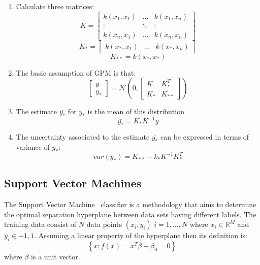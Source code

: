 \begin{enumerate}
\item Calculate three matrices:
\begin{equation}
K=\begin{bmatrix}
k(x_1,x_1) &  \ldots & k(x_1,x_n)\\ 
\vdots  & \ddots &\vdots  \\ 
k(x_n,x_1) &  \ldots & k(x_n,x_n)
\end{bmatrix}
\end{equation}
\begin{equation}
K_*= \begin{bmatrix}
k(x_*,x_1) & \ldots & k(x_*,x_n)
\end{bmatrix}
\end{equation}
\begin{equation}
K_{**}=k(x_*,x_*)
\end{equation}
\item The basic assumption of GPM is that:
\begin{equation}
\begin{bmatrix}
y\\
y_* 
\end{bmatrix}
=\mathcal{N}(0,\begin{bmatrix}
K & K_{*}^{T}\\ 
K_* & K_{**}
\end{bmatrix})
\end{equation}
\item The estimate $\bar{y_*} $ for $y_*$ is the mean of this distribution
\begin{equation}
\bar{y_*}=K_* K^{-1}y
\end{equation}
\item The uncertainty associated to the estimate $\bar{y_*} $ can be expressed in terms of variance of  $y_*$:
\begin{equation}
var(y_*)=K_{**}-k_* K^{-1} K_{*}^{T}
\end{equation}
\end{enumerate}

\subsection{Support Vector Machines}
\label{sec:SVM}
The Support Vector Machine~\cite{SVM_Burges} classifier is a methodology that aims to determine the optimal separation hyperplane between data sets having different labels.
The training data consist of $N$ data points $(x_i,y_i)$ $i=1,\ldots,N$ where $x_i \in \mathbb{R}^M$ and $y_i \in {-1,1}$.
Assuming a linear property of the hyperplane  then its definition is:
\begin{equation}
\left \{ x: f(x)=x^T\beta+\beta_0=0 \right \}
\end{equation}
where $\beta$ is a unit vector. 

